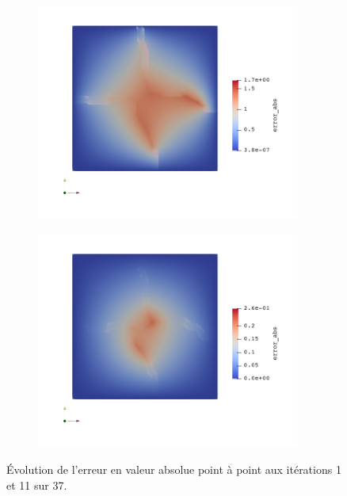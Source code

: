 \documentclass[a4paper,11pt]{article}
\begin{document}
\begin{figure}[H]
	\begin{subfigure}[t]{0.45\textwidth}
		\centering
		\includegraphics[width=0.95\textwidth]{metis_200_200_0_err.png}
	\end{subfigure}
	\hfill
	\begin{subfigure}[t]{0.45\textwidth}
		\centering
		\includegraphics[width=0.95\textwidth]{metis_200_200_10_err.png}
	\end{subfigure}
	\caption{Évolution de l'erreur en valeur absolue point à point aux itérations 1 et 11 sur 37.}
\end{figure}
\end{document}
